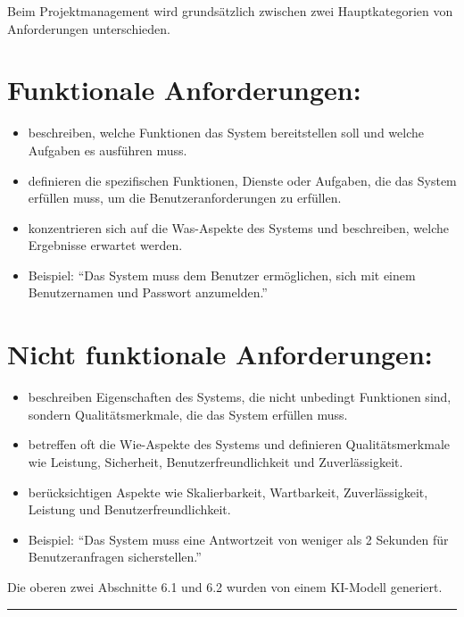 
Beim Projektmanagement wird grundsätzlich zwischen zwei Hauptkategorien von Anforderungen unterschieden.

\section{Funktionale Anforderungen:}
\begin{itemize}
  \item beschreiben, welche Funktionen das System bereitstellen soll und welche Aufgaben es ausführen muss.
  \item definieren die spezifischen Funktionen, Dienste oder Aufgaben, die das System erfüllen muss, um die Benutzeranforderungen zu erfüllen.
  \item konzentrieren sich auf die Was-Aspekte des Systems und beschreiben, welche Ergebnisse erwartet werden.
  \item Beispiel: "`Das System muss dem Benutzer ermöglichen, sich mit einem Benutzernamen und Passwort anzumelden."'
\end{itemize}

\section{Nicht funktionale Anforderungen:}
\begin{itemize}
  \item beschreiben Eigenschaften des Systems, die nicht unbedingt Funktionen sind, sondern Qualitätsmerkmale, die das System erfüllen muss.
  \item betreffen oft die Wie-Aspekte des Systems und definieren Qualitätsmerkmale wie Leistung, Sicherheit, Benutzerfreundlichkeit und Zuverlässigkeit.
  \item berücksichtigen Aspekte wie Skalierbarkeit, Wartbarkeit, Zuverlässigkeit, Leistung und Benutzerfreundlichkeit.
  \item Beispiel: "`Das System muss eine Antwortzeit von weniger als 2 Sekunden für Benutzeranfragen sicherstellen."'
\end{itemize}

Die oberen zwei Abschnitte 6.1 und 6.2 wurden von einem KI-Modell generiert.\cite{chatgpt}

\rule{\linewidth}{0.5pt}

